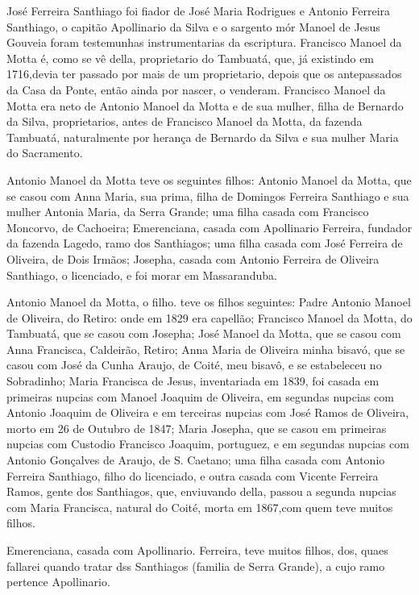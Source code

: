 José Ferreira Santhiago foi fiador de José Maria Rodrigues e Antonio Ferreira Santhiago, o capitão Apollinario da Silva e o sargento mór Manoel de Jesus Gouveia foram testemunhas instrumentarias da escriptura. Francisco Manoel da Motta é, como se vê della, proprietario do Tambuatá, que, já existindo em 1716,devia ter passado por mais de um proprietario, depois que os antepassados da Casa da Ponte, então ainda por nascer, o venderam. Francisco Manoel da Motta era neto de Antonio Manoel
da Motta e de sua mulher, filha de Bernardo da Silva, proprietarios, antes de Francisco Manoel da Motta, da fazenda Tambuatá, naturalmente por herança de Bernardo da Silva e sua mulher Maria do Sacramento.

Antonio Manoel da Motta teve os seguintes filhos: Antonio Manoel da Motta, que se casou com Anna Maria, sua prima, filha de Domingos Ferreira Santhiago e sua mulher Antonia Maria, da Serra Grande; uma filha casada com Francisco Moncorvo, de Cachoeira; Emerenciana, casada com Apollinario Ferreira, fundador da fazenda Lagedo, ramo dos Santhiagos; uma filha casada com José Ferreira de Oliveira, de Dois Irmãos; Josepha, casada com Antonio Ferreira de Oliveira Santhiago, o licenciado, e foi morar em Massaranduba.


Antonio Manoel da Motta, o filho. teve os filhos seguintes: Padre Antonio Manoel de Oliveira, do Retiro: onde em 1829 era capellão; Francisco Manoel da Motta, do Tambuatá, que se casou com Josepha; José Manoel da Motta, que se casou com Anna Francisca, Caldeirão, Retiro; Anna Maria de Oliveira minha bisavó, que se casou com José da Cunha Araujo, de Coité, meu bisavô, e se estabeleceu no Sobradinho; Maria Francisca de Jesus, inventariada em 1839, foi casada em primeiras nupcias com Manoel Joaquim de Oliveira, em segundas nupcias com Antonio Joaquim de Oliveira e em terceiras nupcias com José Ramos de Oliveira, morto em 26 de Outubro de 1847; Maria Josepha, que se casou em primeiras nupcias com Custodio Francisco Joaquim, portuguez, e em segundas nupcias com Antonio Gonçalves de Araujo, de S. Caetano; uma filha casada com Antonio Ferreira Santhiago, filho do licenciado, e outra casada com Vicente Ferreira Ramos\label{vframos}, gente dos Santhiagos, que, enviuvando della, passou a segunda nupcias com Maria Francisca, natural do Coité, morta em 1867,com quem teve muitos filhos.

Emerenciana, casada com Apollinario. Ferreira, teve muitos filhos, dos, quaes fallarei quando tratar dss Santhiagos (familia de Serra Grande), a cujo ramo pertence Apollinario.


